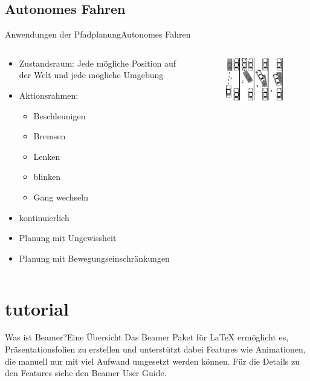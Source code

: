 \documentclass[t,aspectratio=169,dvipsnames]{beamer}
\begin{document}
\subsection{Autonomes Fahren}
\begin{frame}{Anwendungen der Pfadplanung}{Autonomes Fahren}
	\begin{columns}
		\begin{column}[T]{0.6\textwidth}
			\begin{itemize}
				\item Zustandsraum: Jede mögliche Position auf der Welt und jede mögliche Umgebung
				\item Aktionsrahmen:
				\begin{itemize}
					\item Beschleunigen
					\item Bremsen
					\item Lenken
					\item blinken
					\item Gang wechseln		
				\end{itemize}
				\item kontinuierlich
				\item Planung mit Ungewissheit
				\item Planung mit Bewegungseinschränkungen
			\end{itemize}
		\end{column}
		\begin{column}[T]{0.4\textwidth}
			\begin{figure}
				\includegraphics[width=6.0cm]{images/img239.png}
				\caption{} 
			\end{figure}
		\end{column}
	\end{columns}
\end{frame}



\section{tutorial}
\begin{frame}{Was ist Beamer?}{Eine Übersicht}
Das Beamer Paket für \LaTeX{} ermöglicht es, Präsentationsfolien zu erstellen und unterstützt dabei Features wie Animationen, die manuell nur mit viel Aufwand umgesetzt werden können.
Für die Details zu den Features siehe den Beamer User Guide\cite{BeamerDoc}.
\end{frame}
\end{document}
